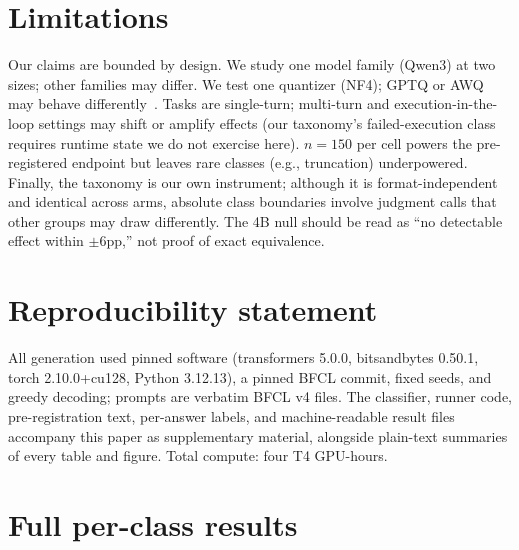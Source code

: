 \documentclass{article}
\begin{document}
\section{Limitations}
\label{sec:limitations}

Our claims are bounded by design. We study one model family (Qwen3) at two
sizes; other families may differ. We test one quantizer (NF4); GPTQ or AWQ
may behave differently~\citep{frantar2023gptq,lin2024awq}. Tasks are
single-turn; multi-turn and execution-in-the-loop settings may shift or
amplify effects (our taxonomy's failed-execution class requires runtime state
we do not exercise here). $n{=}150$ per cell powers the pre-registered
endpoint but leaves rare classes (e.g., truncation) underpowered. Finally,
the taxonomy is our own instrument; although it is format-independent and
identical across arms, absolute class boundaries involve judgment calls that
other groups may draw differently. The 4B null should be read as ``no
detectable effect within $\pm$6pp,'' not proof of exact equivalence.

\section{Reproducibility statement}

All generation used pinned software (transformers 5.0.0, bitsandbytes 0.50.1,
torch 2.10.0+cu128, Python 3.12.13), a pinned BFCL commit, fixed seeds, and
greedy decoding; prompts are verbatim BFCL v4 files. The classifier, runner
code, pre-registration text, per-answer labels, and machine-readable result
files accompany this paper as supplementary material, alongside plain-text
summaries of every table and figure. Total compute: four T4 GPU-hours.




\appendix

\section{Full per-class results}
\label{app:full}
\end{document}
